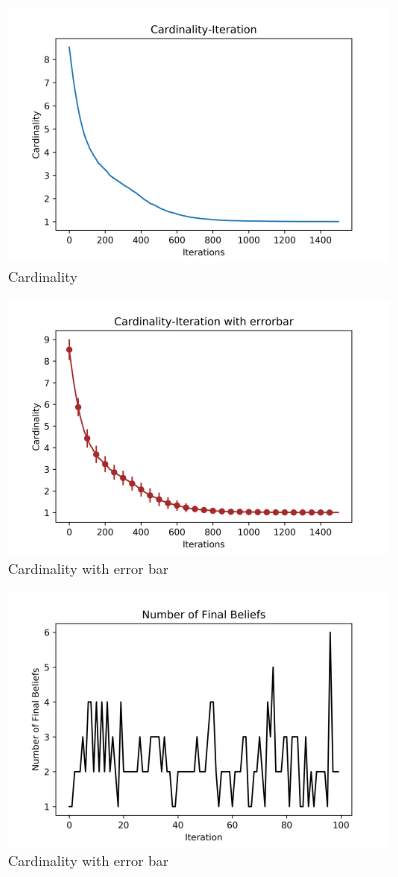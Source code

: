 \documentclass[a4paper,12pt]{article}
\begin{document}
    \begin{figure}[H]
    	\centering
    	\includegraphics[width=0.9\textwidth]{Card100_4_1500_100_5}
    	\caption{Cardinality}\label{Card100_4_1500_100_5_h}
    \end{figure}
    \begin{figure}[H]
    	\centering
    	\includegraphics[width=0.9\textwidth]{CardErr100_4_1500_100_5}
    	\caption{Cardinality with error bar}\label{CardErr100_4_1500_100_5_h}
    \end{figure}
    \begin{figure}[H]
    	\centering
    	\includegraphics[width=0.9\textwidth]{numbef100_4_1500_100_5}
    	\caption{Cardinality with error bar}\label{numbef100_4_1500_100_5}
    \end{figure}
\end{document}
